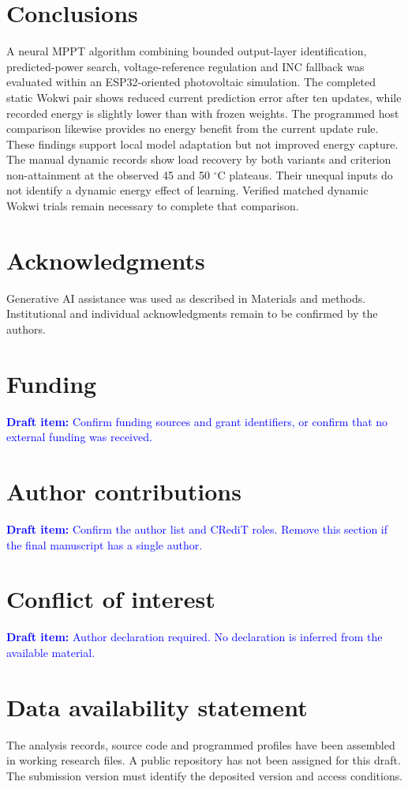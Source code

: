\documentclass[Acad.Energy.,researcharticle,9pt,twoside,oneauthor]{Definitions/jams_academia}
\newcommand{\pending}[1]{\par\smallskip\noindent\textcolor{blue}{\textbf{Draft item:} #1}\par\smallskip}
\begin{document}
\section{Conclusions}
A neural MPPT algorithm combining bounded output-layer identification, predicted-power search, voltage-reference regulation and INC fallback was evaluated within an ESP32-oriented photovoltaic simulation. The completed static Wokwi pair shows reduced current prediction error after ten updates, while recorded energy is slightly lower than with frozen weights. The programmed host comparison likewise provides no energy benefit from the current update rule. These findings support local model adaptation but not improved energy capture. The manual dynamic records show load recovery by both variants and criterion non-attainment at the observed 45 and 50 $^\circ$C plateaus. Their unequal inputs do not identify a dynamic energy effect of learning. Verified matched dynamic Wokwi trials remain necessary to complete that comparison.

\section*{Acknowledgments}
Generative AI assistance was used as described in Materials and methods. Institutional and individual acknowledgments remain to be confirmed by the authors.
\section*{Funding}
\pending{Confirm funding sources and grant identifiers, or confirm that no external funding was received.}
\section*{Author contributions}
\pending{Confirm the author list and CRediT roles. Remove this section if the final manuscript has a single author.}
\section*{Conflict of interest}
\pending{Author declaration required. No declaration is inferred from the available material.}
\section*{Data availability statement}
The analysis records, source code and programmed profiles have been assembled in working research files. A public repository has not been assigned for this draft. The submission version must identify the deposited version and access conditions.
\end{document}
